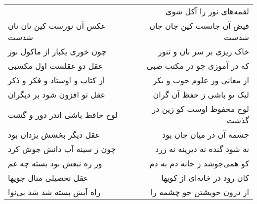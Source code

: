 \begin{center}
\begin{longtable}{l p{0.5cm} r}
&&
لقمه‌های نور را آکل شوی
\\
عکس آن نورست کین نان نان شدست
&&
فیض آن جانست کین جان جان شدست
\\
چون خوری یکبار از ماکول نور
&&
خاک ریزی بر سر نان و تنور
\\
عقل دو عقلست اول مکسبی
&&
که در آموزی چو در مکتب صبی
\\
از کتاب و اوستاد و فکر و ذکر
&&
از معانی وز علوم خوب و بکر
\\
عقل تو افزون شود بر دیگران
&&
لیک تو باشی ز حفظ آن گران
\\
لوح حافظ باشی اندر دور و گشت
&&
لوح محفوظ اوست کو زین در گذشت
\\
عقل دیگر بخشش یزدان بود
&&
چشمهٔ آن در میان جان بود
\\
چون ز سینه آب دانش جوش کرد
&&
نه شود گنده نه دیرینه نه زرد
\\
ور ره نبعش بود بسته چه غم
&&
کو همی‌جوشد ز خانه دم به دم
\\
عقل تحصیلی مثال جویها
&&
کان رود در خانه‌ای از کویها
\\
راه آبش بسته شد شد بی‌نوا
&&
از درون خویشتن جو چشمه را
\\
\end{longtable}
\end{center}
